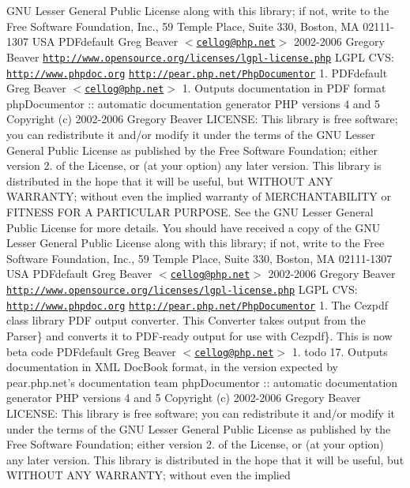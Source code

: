 \-G\-N\-U \-Lesser \-General \-Public \-License along with this library; if not, write to the \-Free \-Software \-Foundation, \-Inc., 59 \-Temple \-Place, \-Suite 330, \-Boston, \-M\-A 02111-\/1307 \-U\-S\-A   \-P\-D\-Fdefault  \-Greg \-Beaver $<$\href{mailto:cellog@php.net}{\tt cellog@php.\-net}$>$  2002-\/2006 \-Gregory \-Beaver  \href{http://www.opensource.org/licenses/lgpl-license.php}{\tt http\-://www.\-opensource.\-org/licenses/lgpl-\/license.\-php} \-L\-G\-P\-L  \-C\-V\-S\-:    \href{http://www.phpdoc.org}{\tt http\-://www.\-phpdoc.\-org}  \href{http://pear.php.net/PhpDocumentor}{\tt http\-://pear.\-php.\-net/\-Php\-Documentor}  1.   \-P\-D\-Fdefault  \-Greg \-Beaver $<$\href{mailto:cellog@php.net}{\tt cellog@php.\-net}$>$  1.  \-Outputs documentation in \-P\-D\-F format  php\-Documentor \-:\-: automatic documentation generator  \-P\-H\-P versions 4 and 5  \-Copyright (c) 2002-\/2006 \-Gregory \-Beaver  \-L\-I\-C\-E\-N\-S\-E\-:  \-This library is free software; you can redistribute it and/or modify it under the terms of the \-G\-N\-U \-Lesser \-General \-Public \-License as published by the \-Free \-Software \-Foundation; either version 2. of the \-License, or (at your option) any later version.  \-This library is distributed in the hope that it will be useful, but \-W\-I\-T\-H\-O\-U\-T \-A\-N\-Y \-W\-A\-R\-R\-A\-N\-T\-Y; without even the implied warranty of \-M\-E\-R\-C\-H\-A\-N\-T\-A\-B\-I\-L\-I\-T\-Y or \-F\-I\-T\-N\-E\-S\-S \-F\-O\-R \-A \-P\-A\-R\-T\-I\-C\-U\-L\-A\-R \-P\-U\-R\-P\-O\-S\-E. \-See the \-G\-N\-U \-Lesser \-General \-Public \-License for more details.  \-You should have received a copy of the \-G\-N\-U \-Lesser \-General \-Public \-License along with this library; if not, write to the \-Free \-Software \-Foundation, \-Inc., 59 \-Temple \-Place, \-Suite 330, \-Boston, \-M\-A 02111-\/1307 \-U\-S\-A   \-P\-D\-Fdefault  \-Greg \-Beaver $<$\href{mailto:cellog@php.net}{\tt cellog@php.\-net}$>$  2002-\/2006 \-Gregory \-Beaver  \href{http://www.opensource.org/licenses/lgpl-license.php}{\tt http\-://www.\-opensource.\-org/licenses/lgpl-\/license.\-php} \-L\-G\-P\-L  \-C\-V\-S\-:    \href{http://www.phpdoc.org}{\tt http\-://www.\-phpdoc.\-org}  \href{http://pear.php.net/PhpDocumentor}{\tt http\-://pear.\-php.\-net/\-Php\-Documentor}  1.  \-The \-Cezpdf class library \-P\-D\-F output converter. \-This \-Converter takes output from the  \-Parser\} and converts it to \-P\-D\-F-\/ready output for use with  \-Cezpdf\}. \-This is now beta code   \-P\-D\-Fdefault  \-Greg \-Beaver $<$\href{mailto:cellog@php.net}{\tt cellog@php.\-net}$>$  1.    todo 17.  \-Outputs documentation in \-X\-M\-L \-Doc\-Book format, in the version expected by pear.\-php.\-net's documentation team  php\-Documentor \-:\-: automatic documentation generator  \-P\-H\-P versions 4 and 5  \-Copyright (c) 2002-\/2006 \-Gregory \-Beaver  \-L\-I\-C\-E\-N\-S\-E\-:  \-This library is free software; you can redistribute it and/or modify it under the terms of the \-G\-N\-U \-Lesser \-General \-Public \-License as published by the \-Free \-Software \-Foundation; either version 2. of the \-License, or (at your option) any later version.  \-This library is distributed in the hope that it will be useful, but \-W\-I\-T\-H\-O\-U\-T \-A\-N\-Y \-W\-A\-R\-R\-A\-N\-T\-Y; without even the implied 